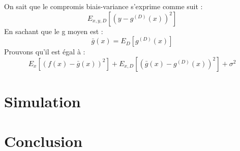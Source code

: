 \documentclass[a4paper]{article}
\begin{document}
\newpage

On sait que le compromis biais-variance s'exprime comme suit : 
\[ E_{x,y,D}[(y-g^{(D)}(x))^2] \]
En sachant que le g moyen est :
\begin{equation}
\label{g_moyen}
\bar{g}(x) = E_D [g^{(D)}(x)]
\end{equation}
Prouvons qu'il est égal à :
\[ E_x[(f(x) - \bar{g}(x))^2] + E_{x,D}[(\bar{g}(x) - g^{(D)}(x))^2] + \sigma^2 \]

\section{Simulation}
 
\newpage

\section{Conclusion}

\newpage
\end{document}

